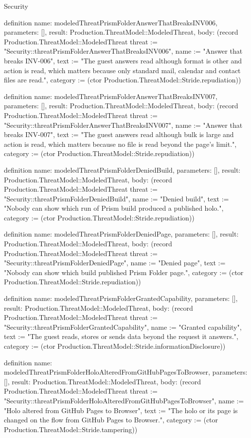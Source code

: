 \begin{lexlean}{Security}
\begin{semanticmodule}
definition{
  name: modeledThreatPrismFolderAnswerThatBreaksINV006,
  parameters: [],
  result: Production.ThreatModel::ModeledThreat,
  body: (record Production.ThreatModel::ModeledThreat {threat := "Security::threatPrismFolderAnswerThatBreaksINV006", name := "Answer that breaks INV-006", text := "The guest answers read although format is other and action is read, which matters because only standard mail, calendar and contact files are read.", category := (ctor Production.ThreatModel::Stride.repudiation)})
}

definition{
  name: modeledThreatPrismFolderAnswerThatBreaksINV007,
  parameters: [],
  result: Production.ThreatModel::ModeledThreat,
  body: (record Production.ThreatModel::ModeledThreat {threat := "Security::threatPrismFolderAnswerThatBreaksINV007", name := "Answer that breaks INV-007", text := "The guest answers read although bulk is large and action is read, which matters because no file is read beyond the page's limit.", category := (ctor Production.ThreatModel::Stride.repudiation)})
}

definition{
  name: modeledThreatPrismFolderDeniedBuild,
  parameters: [],
  result: Production.ThreatModel::ModeledThreat,
  body: (record Production.ThreatModel::ModeledThreat {threat := "Security::threatPrismFolderDeniedBuild", name := "Denied build", text := "Nobody can show which run of Prism build produced a published holo.", category := (ctor Production.ThreatModel::Stride.repudiation)})
}

definition{
  name: modeledThreatPrismFolderDeniedPage,
  parameters: [],
  result: Production.ThreatModel::ModeledThreat,
  body: (record Production.ThreatModel::ModeledThreat {threat := "Security::threatPrismFolderDeniedPage", name := "Denied page", text := "Nobody can show which build published Prism Folder page.", category := (ctor Production.ThreatModel::Stride.repudiation)})
}

definition{
  name: modeledThreatPrismFolderGrantedCapability,
  parameters: [],
  result: Production.ThreatModel::ModeledThreat,
  body: (record Production.ThreatModel::ModeledThreat {threat := "Security::threatPrismFolderGrantedCapability", name := "Granted capability", text := "The guest reads, stores or sends data beyond the request it answers.", category := (ctor Production.ThreatModel::Stride.informationDisclosure)})
}

definition{
  name: modeledThreatPrismFolderHoloAlteredFromGitHubPagesToBrowser,
  parameters: [],
  result: Production.ThreatModel::ModeledThreat,
  body: (record Production.ThreatModel::ModeledThreat {threat := "Security::threatPrismFolderHoloAlteredFromGitHubPagesToBrowser", name := "Holo altered from GitHub Pages to Browser", text := "The holo or its page is changed on the flow from GitHub Pages to Browser.", category := (ctor Production.ThreatModel::Stride.tampering)})
}


\end{semanticmodule}
\end{lexlean}
